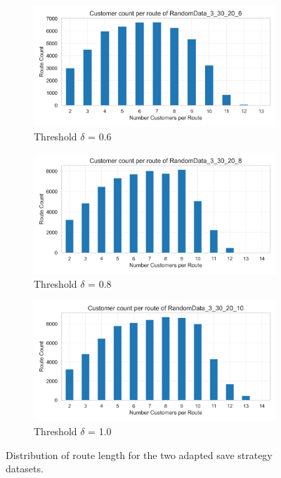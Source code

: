 \begin{figure}[ht]
    \centering
    \begin{subfigure}[t]{.5\textwidth}
        \centering
        \includegraphics[width=\linewidth]{pictures/dataset_structure/no_cust_plot_RandomData_3_30_20_6.png}
        \caption{Threshold $\delta$ = 0.6}
        \label{fig:ds-a}
    \end{subfigure}%
    \begin{subfigure}[t]{.5\textwidth}
        \centering
        \includegraphics[width=\linewidth]{pictures/dataset_structure/no_cust_plot_RandomData_3_30_20_8.png}
        \caption{Threshold $\delta$ = 0.8}
        \label{fig:ds-b}
    \end{subfigure}
    \begin{subfigure}[t]{.5\textwidth}
        \centering
        \includegraphics[width=\linewidth]{pictures/dataset_structure/no_cust_plot_RandomData_3_30_20_10.png}
        \caption{Threshold $\delta$ = 1.0}
        \label{fig:ds-c}
    \end{subfigure}
    \caption{Distribution of route length for the two adapted save strategy datasets.}
    \label{fig:route-dists}
\end{figure}

